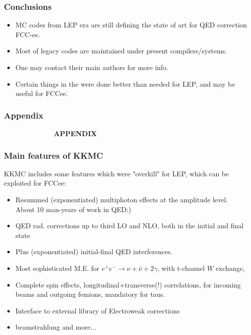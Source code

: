 \documentclass{beamer}
\begin{document}
\begin{frame}[fragile]
\frametitle{\bf Conclusions}

\begin{itemize}
\item
MC codes from LEP era are still defining
the state of art for QED correction FCC-ee.
\item
Most of legacy codes are maintained under present compilers/systems.
\item
One may contact their main authors for more info.
\item
Certain things in the were done better than needed
for LEP, and may be useful for FCCee.
\end{itemize}

\end{frame}





\begin{frame}[fragile]
\frametitle{\bf Appendix}

\vspace{20mm}
\Huge\bf~~~~~~~~~~~~ APPENDIX
\end{frame}


\begin{frame}[fragile]
\frametitle{\bf Main features of KKMC}

KKMC includes some features which were "overkill" for LEP,
which can be exploited for FCCee:
\begin{itemize}
\item
Resummed (exponentiated) multiphoton effects at the amplitude level.\\
About 10 man-years of work in QED:)
\item
QED rad. corrections up to third LO and NLO,
both in the initial and final state
\item
Plus (exponentiated) initial-final QED interferences.
\item
Most sophisticated M.E. for $e^+e^-\to \nu+\bar\nu+2\gamma$,
with t-channel $W$ exchange,
\item
Complete spin effects, longitudinal+transverse(!) correlations, 
for incoming beams and outgoing femions, mandatory for taus.
\item
Interface to external library of Electroweak corrections
\item
beamstrahlung and more...
\end{itemize}
\end{frame}
\end{document}
